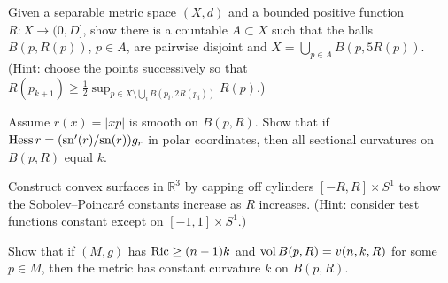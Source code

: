 \begin{remark}
  \label{rem:pet-ch7-ex-5}

  Given a separable metric space $(X,d)$ and a bounded positive function
  $R:X\to(0,D]$, show there is a countable $A\subset X$ such that the balls
  $B(p,R(p))$, $p\in A$, are pairwise disjoint and $X=\bigcup_{p\in
  A}B(p,5R(p))$. (Hint: choose the points successively so that
  $R(p_{k+1})\ge\tfrac12\sup_{p\in X\setminus\bigcup_iB(p_i,2R(p_i))}R(p)$.)
\end{remark}

\begin{remark}
  \label{rem:pet-ch7-ex-6}

  Assume $r(x)=|xp|$ is smooth on $B(p,R)$. Show that if
  $\operatorname{Hess} r=(\mathrm{sn}'(r)/\mathrm{sn}(r))g_r$ in polar coordinates, then all sectional
  curvatures on $B(p,R)$ equal $k$.
\end{remark}

\begin{remark}
  \label{rem:pet-ch7-ex-7}

  Construct convex surfaces in $\mathbb{R}^3$ by capping off cylinders
  $[-R,R]\times S^1$ to show the Sobolev--Poincaré constants increase as $R$
  increases. (Hint: consider test functions constant except on $[-1,1]\times
  S^1$.)
\end{remark}

\begin{remark}
  \label{rem:pet-ch7-ex-8}

  Show that if $(M,g)$ has $\operatorname{Ric}\ge(n-1)k$ and $\operatorname{vol} B(p,R)=v(n,k,R)$ for some
  $p\in M$, then the metric has constant curvature $k$ on $B(p,R)$.
\end{remark}

